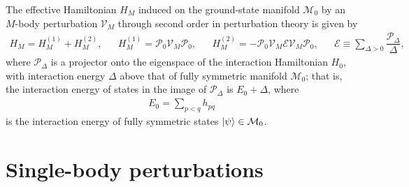 \documentclass[nofootinbib,notitlepage,11pt]{revtex4-2}
\newcommand{\f}[2]{\dfrac{#1}{#2}} %
\newcommand{\1}{\mathds{1}}
\newcommand{\E}{\mathcal{E}}
\newcommand{\M}{\mathcal{M}}
\renewcommand{\P}{\mathcal{P}}
\newcommand{\V}{\mathcal{V}}
\begin{document}
The effective Hamiltonian $H_M$ induced on the ground-state manifold
$\M_0$ by an $M$-body perturbation $\V_M$ through second order in
perturbation theory is given by\cite{bravyi2011schrieffer,
  perlin2019effective}
\begin{align}
  H_M = H_M^{(1)} + H_M^{(2)},
  &&
  H_M^{(1)} = \P_0 \V_M \P_0,
  &&
  H_M^{(2)} = - \P_0 \V_M \E \V_M \P_0,
  &&
  \E \equiv \sum_{\Delta>0} \f{\P_\Delta}{\Delta},
\end{align}
where $\P_\Delta$ is a projector onto the eigenspace of the
interaction Hamiltonian $H_0$, with interaction energy $\Delta$ above
that of fully symmetric manifold $\M_0$; that is, the interaction
energy of states in the image of $\P_\Delta$ is $E_0+\Delta$, where
\begin{align}
  E_0 = \sum_{p<q} h_{pq}
\end{align}
is the interaction energy of fully symmetric states $\ket\psi\in\M_0$.

\section{Single-body perturbations}
\end{document}
